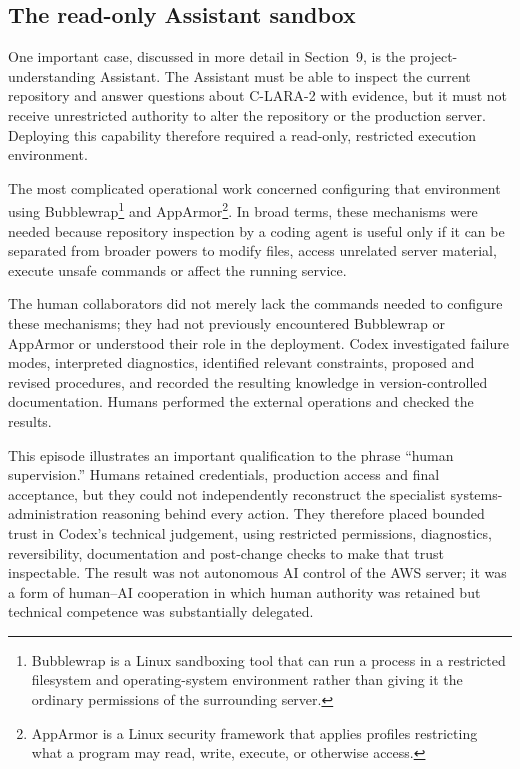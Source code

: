 \subsection{The read-only Assistant sandbox}

One important case, discussed in more detail in Section~9, is the
project-understanding Assistant. The Assistant must be able to inspect the
current repository and answer questions about C-LARA-2 with evidence, but it
must not receive unrestricted authority to alter the repository or the
production server. Deploying this capability therefore required a read-only,
restricted execution environment.

The most complicated operational work concerned configuring that environment
using Bubblewrap\footnote{Bubblewrap is a Linux sandboxing tool that can run a
process in a restricted filesystem and operating-system environment rather
than giving it the ordinary permissions of the surrounding server.} and
AppArmor\footnote{AppArmor is a Linux security framework that applies profiles
restricting what a program may read, write, execute, or otherwise access.}.
In broad terms, these mechanisms were needed because repository inspection by
a coding agent is useful only if it can be separated from broader powers to
modify files, access unrelated server material, execute unsafe commands or
affect the running service.

The human collaborators did not merely lack the commands needed to configure
these mechanisms; they had not previously encountered Bubblewrap or AppArmor
or understood their role in the deployment. Codex investigated failure modes,
interpreted diagnostics, identified relevant constraints, proposed and revised
procedures, and recorded the resulting knowledge in version-controlled
documentation. Humans performed the external operations and checked the
results.

This episode illustrates an important qualification to the phrase ``human
supervision.'' Humans retained credentials, production access and final
acceptance, but they could not independently reconstruct the specialist
systems-administration reasoning behind every action. They therefore placed
bounded trust in Codex's technical judgement, using restricted permissions,
diagnostics, reversibility, documentation and post-change checks to make that
trust inspectable. The result was not autonomous AI control of the AWS server;
it was a form of human--AI cooperation in which human authority was retained
but technical competence was substantially delegated.

